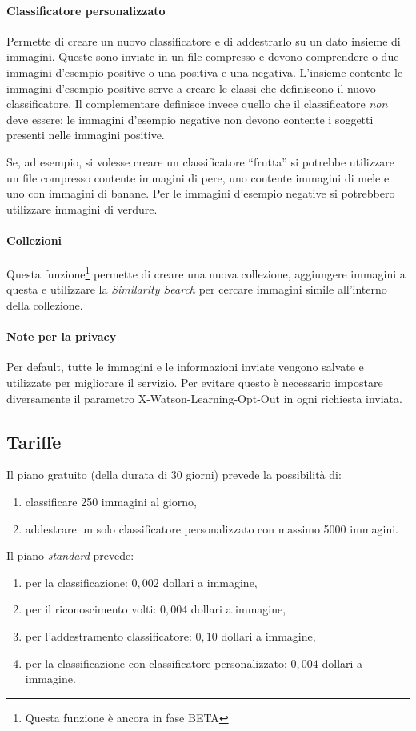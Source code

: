 \paragraph{Classificatore personalizzato} Permette di creare un nuovo classificatore e di addestrarlo su un dato insieme di immagini. Queste sono inviate in un file compresso e devono comprendere o due immagini d'esempio positive o una positiva e una negativa. L'insieme contente le immagini d'esempio positive serve a creare le classi che definiscono il nuovo classificatore. Il complementare definisce invece quello che il classificatore \textit{non} deve essere; le immagini d'esempio negative non devono contente i soggetti presenti nelle immagini positive.

Se, ad esempio, si volesse creare un classificatore ``frutta'' si potrebbe utilizzare un file compresso contente immagini di pere, uno contente immagini di mele e uno con immagini di banane.
Per le immagini d'esempio negative si potrebbero utilizzare immagini di verdure.

\paragraph{Collezioni} Questa funzione\footnote{Questa funzione è ancora in fase BETA} permette di creare una nuova collezione, aggiungere immagini a questa e utilizzare la \textit{Similarity Search} per cercare immagini simile all'interno della collezione.

\paragraph{Note per la privacy} Per default, tutte le immagini e le informazioni inviate vengono salvate e utilizzate per migliorare il servizio. Per evitare questo è necessario impostare diversamente il parametro \textsf{X-Watson-Learning-Opt-Out} in ogni richiesta inviata.

\subsection{Tariffe}
Il piano gratuito (della durata di 30 giorni) prevede la possibilità di:
\begin{enumerate}
\item classificare 250 immagini al giorno,
\item addestrare un solo classificatore personalizzato con massimo 5000 immagini.
\end{enumerate}
Il piano \textit{standard} prevede:
\begin{enumerate}
\item per la classificazione: $0,002$ dollari a immagine,
\item per il riconoscimento volti: $0,004$ dollari a immagine,
\item per l'addestramento classificatore: $0,10$ dollari a immagine,
\item per la classificazione con classificatore personalizzato: $0,004$ dollari a immagine.
\end{enumerate}


